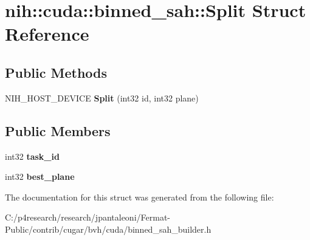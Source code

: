 \hypertarget{structnih_1_1cuda_1_1binned__sah_1_1_split}{}\section{nih\+:\+:cuda\+:\+:binned\+\_\+sah\+:\+:Split Struct Reference}
\label{structnih_1_1cuda_1_1binned__sah_1_1_split}
\subsection*{Public Methods}
\begin{DoxyCompactItemize}
\item 
\mbox{\label{structnih_1_1cuda_1_1binned__sah_1_1_split_a74ab233f7e51e2721e74b4cf3eff0d60}} 
N\+I\+H\+\_\+\+H\+O\+S\+T\+\_\+\+D\+E\+V\+I\+CE {\bfseries Split} (int32 id, int32 plane)
\end{DoxyCompactItemize}
\subsection*{Public Members}
\begin{DoxyCompactItemize}
\item 
\mbox{\label{structnih_1_1cuda_1_1binned__sah_1_1_split_a77ebba0b7f5f76acd3301643412ab8dc}} 
int32 {\bfseries task\+\_\+id}
\item 
\mbox{\label{structnih_1_1cuda_1_1binned__sah_1_1_split_a589333c7bbb9adfefa3cc628f27da589}} 
int32 {\bfseries best\+\_\+plane}
\end{DoxyCompactItemize}


The documentation for this struct was generated from the following file\+:\begin{DoxyCompactItemize}
\item 
C\+:/p4research/research/jpantaleoni/\+Fermat-\/\+Public/contrib/cugar/bvh/cuda/binned\+\_\+sah\+\_\+builder.\+h\end{DoxyCompactItemize}
